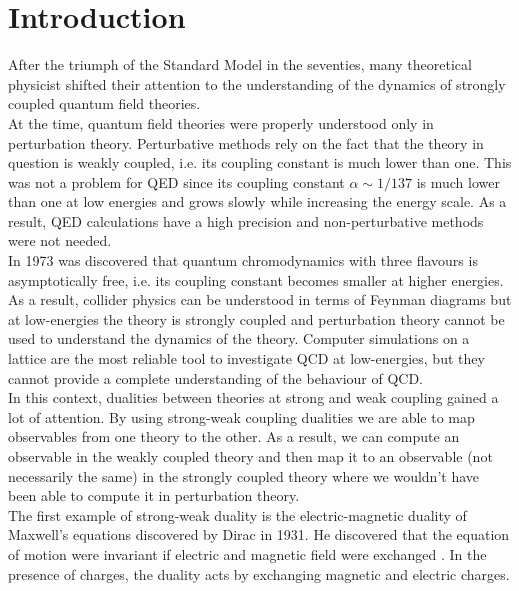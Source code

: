 
\chapter{Introduction}

After the triumph of the Standard Model in the seventies, many theoretical physicist shifted their attention to the understanding of the dynamics of strongly coupled quantum field theories. \\
At the time, quantum field theories were properly understood only in perturbation theory. 
Perturbative methods rely on the fact that the theory in question is weakly coupled, i.e. its coupling constant is much lower than one. This was not a problem for QED since its coupling constant $\alpha \sim 1/137$ is much lower than one at low energies and grows slowly while increasing the energy scale.
As a result, QED calculations have a high precision and non-perturbative methods were not needed.\\
In 1973 was discovered that quantum chromodynamics with three flavours is asymptotically free, i.e. its coupling constant becomes smaller at higher energies. 
As a result, collider physics can be understood in terms of Feynman diagrams but at low-energies the theory is strongly coupled and perturbation theory cannot be used to understand the dynamics of the theory.
Computer simulations on a lattice are the most reliable tool to investigate QCD at low-energies, but they cannot provide a complete understanding of the behaviour of QCD.\\ 
In this context, dualities between theories at strong and weak coupling gained a lot of attention. 
By using strong-weak coupling dualities we are able to map observables from one theory to the other.
As a result, we can compute an observable in the weakly coupled theory and then map it to an observable (not necessarily the same) in the strongly coupled theory where we wouldn't have been able to compute it in perturbation theory.  \\
The first example of strong-weak duality is the electric-magnetic duality of Maxwell's equations discovered by Dirac in 1931.  
He discovered that the equation of motion were invariant if electric and magnetic field were exchanged . 
In the presence of charges, the duality acts by exchanging magnetic and electric charges. 

